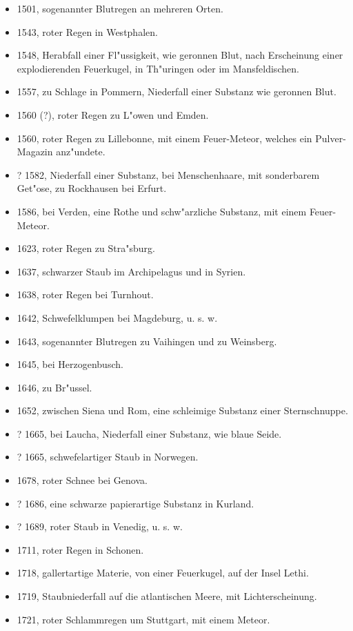 \documentclass[a4paper, 11pt, oneside, polutonikogreek, german]{article}
\begin{document}
\begin{itemize}
    \item 1501, sogenannter Blutregen an mehreren Orten.
    \item 1543, roter Regen in Westphalen.
    \item 1548, Herabfall einer Fl"ussigkeit, wie geronnen Blut, nach Erscheinung einer explodierenden Feuerkugel, in Th"uringen oder im Mansfeldischen.
    \item 1557, zu Schlage in Pommern, Niederfall einer Substanz wie geronnen Blut.
    \item 1560 (?), roter Regen zu L"owen und Emden.
    \item 1560, roter Regen zu Lillebonne, mit einem Feuer-Meteor, welches ein Pulver-Magazin anz"undete.
    \item ? 1582, Niederfall einer Substanz, bei Menschenhaare, mit sonderbarem Get"ose, zu Rockhausen bei Erfurt.
    \item 1586, bei Verden, eine Rothe und schw"arzliche Substanz, mit einem Feuer-Meteor.
    \item 1623, roter Regen zu Stra"sburg.
    \item 1637, schwarzer Staub im Archipelagus und in Syrien.
    \item 1638, roter Regen bei Turnhout.
    \item 1642, Schwefelklumpen bei Magdeburg, u. s. w.
    \item 1643, sogenannter Blutregen zu Vaihingen und zu Weinsberg.
    \item 1645, bei Herzogenbusch.
    \item 1646, zu Br"ussel.
    \item 1652, zwischen Siena und Rom, eine schleimige Substanz einer Sternschnuppe.
    \item ? 1665, bei Laucha, Niederfall einer Substanz, wie blaue Seide.
    \item ? 1665, schwefelartiger Staub in Norwegen.
    \item 1678, roter Schnee bei Genova.
    \item ? 1686, eine schwarze papierartige Substanz in Kurland.
    \item ? 1689, roter Staub in Venedig, u. s. w.
    \item 1711, roter Regen in Schonen.
    \item 1718, gallertartige Materie, von einer Feuerkugel, auf der Insel Lethi.
    \item 1719, Staubniederfall auf die atlantischen Meere, mit Lichterscheinung.
    \item 1721, roter Schlammregen um Stuttgart, mit einem Meteor.

\end{itemize}
\end{document}
